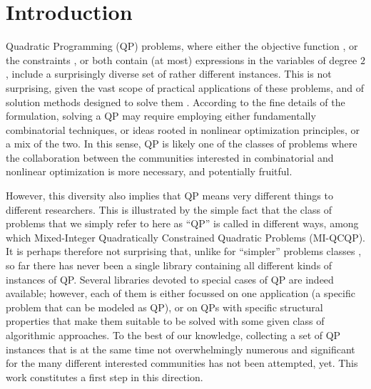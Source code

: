 
\section{Introduction}\label{sec:intro}

Quadratic Programming (QP) problems, where either the objective function \cite{wiki:qp}, or the constraints \cite{wiki:qcqp}, or both contain (at most) expressions in the variables of degree $2$, include a surprisingly diverse set of rather different instances. This is not surprising, given the vast scope of practical applications of these problems, and of solution methods designed to solve them \cite{GoulToin00a}. According to the fine details of the formulation, solving a QP may require employing either fundamentally combinatorial techniques, or ideas rooted in nonlinear optimization principles, or a mix of the two. In this sense, QP is likely one of the classes of problems where the collaboration between the communities interested in combinatorial and nonlinear optimization is more necessary, and potentially fruitful.

However, this diversity also implies that QP means very different things to different researchers. This is illustrated by the simple fact that the class of problems that we simply refer to here as ``QP'' is called in different ways, among which Mixed-Integer Quadratically Constrained Quadratic Problems (MI-QCQP). It is perhaps therefore not surprising that, unlike for ``simpler'' problems classes \cite{Koch2011}, so far there has never been a single library containing all different kinds of instances of QP. Several libraries devoted to special cases of QP are indeed available; however, each of them is either focussed on one application (a specific problem that can be modeled as QP), or on QPs with specific structural properties that make them suitable to be solved with some given class of algorithmic approaches. To the best of our knowledge, collecting a set of QP instances that is at the same time not overwhelmingly numerous and significant for the many different interested communities has not been attempted, yet. This work constitutes a first step in this direction.

